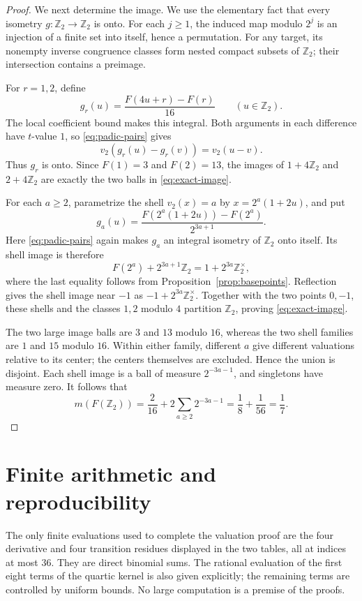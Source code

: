 \documentclass[11pt]{article}
\theoremstyle{remark}\newtheorem{remark}[theorem]{Remark}
\newcommand{\Ztwo}{\mathbb Z_2}\newcommand{\Qtwo}{\mathbb Q_2}
\begin{document}
\begin{proof}
We next determine the image. We use the elementary fact that every
isometry $g:\Ztwo\to\Ztwo$ is onto. For each $j\ge1$, the induced
map modulo $2^j$ is an injection of a finite set into itself, hence a
permutation. For any target, its nonempty inverse congruence classes
form nested compact subsets of $\Ztwo$; their intersection contains a
preimage.

For $r=1,2$, define
\[
 g_r(u)=\frac{F(4u+r)-F(r)}{16}\qquad(u\in\Ztwo).
\]
The local coefficient bound makes this integral. Both arguments in
each difference have $t$-value $1$, so \eqref{eq:padic-pairs} gives
\[
 v_2(g_r(u)-g_r(v))=v_2(u-v).
\]
Thus $g_r$ is onto. Since $F(1)=3$ and $F(2)=13$, the images of
$1+4\Ztwo$ and $2+4\Ztwo$ are exactly the two balls in
\eqref{eq:exact-image}.

For each $a\ge2$, parametrize the shell $v_2(x)=a$ by
$x=2^a(1+2u)$, and put
\[
 g_a(u)=\frac{F(2^a(1+2u))-F(2^a)}{2^{3a+1}}.
\]
Here \eqref{eq:padic-pairs} again makes $g_a$ an integral isometry of
$\Ztwo$ onto itself. Its shell image is therefore
\[
 F(2^a)+2^{3a+1}\Ztwo=1+2^{3a}\Ztwo^\times,
\]
where the last equality follows from
Proposition~\ref{prop:basepoints}. Reflection gives the shell image
near $-1$ as $-1+2^{3a}\Ztwo^\times$. Together with the two points
$0,-1$, these shells and the classes $1,2$ modulo $4$ partition
$\Ztwo$, proving \eqref{eq:exact-image}.

The two large image balls are $3$ and $13$ modulo $16$, whereas
the two shell families are $1$ and $15$ modulo $16$. Within either
family, different $a$ give different valuations relative to its
center; the centers themselves are excluded. Hence the union is
disjoint. Each shell image is a ball of measure $2^{-3a-1}$, and
singletons have measure zero. It follows that
\[
 m(F(\Ztwo))=\frac2{16}+2\sum_{a\ge2}2^{-3a-1}
 =\frac18+\frac1{56}=\frac17.
\]
\end{proof}


\section{Finite arithmetic and reproducibility}
The only finite evaluations used to complete the valuation proof are
the four derivative and four transition residues displayed in the two
tables, all at indices at most $36$. They are direct binomial sums.
The rational evaluation of the first eight terms of the quartic kernel
is also given explicitly; the remaining terms are controlled by
uniform bounds. No large computation is a premise of the proofs.
\end{document}
